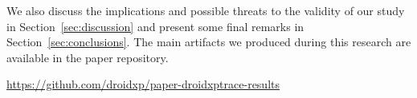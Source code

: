 We also discuss the implications and possible threats to the validity of our study in Section~\ref{sec:discussion} and present some final remarks in Section~\ref{sec:conclusions}. 
The main artifacts we produced during this research are available in the paper repository.

\begin{small}
  \begin{center}
    \url{https://github.com/droidxp/paper-droidxptrace-results}
  \end{center}
\end{small}

